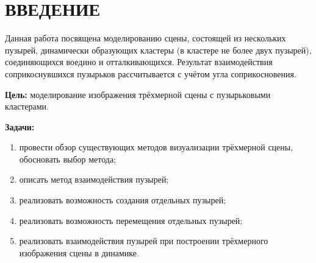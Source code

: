 \chapter*{ВВЕДЕНИЕ}
Данная работа посвящена моделированию сцены, состоящей из нескольких пузырей, динамически образующих кластеры (в кластере не более двух пузырей), соединяющихся воедино и отталкивающихся. Результат взаимодействия соприкоснувшихся пузырьков рассчитывается с учётом угла соприкосновения.

\textbf{Цель:} моделирование изображения трёхмерной сцены с пузырьковыми кластерами.

\textbf{Задачи:}
\begin{enumerate}[label={\arabic*)}]
	\item провести обзор существующих методов визуализации трёхмерной сцены, обосновать выбор метода;
	\item описать метод взаимодействия пузырей;
	\item реализовать возможность создания отдельных пузырей;
	\item реализовать возможность перемещения отдельных пузырей;
	\item реализовать взаимодействия пузырей при построении трёхмерного изображения сцены в динамике.
\end{enumerate}